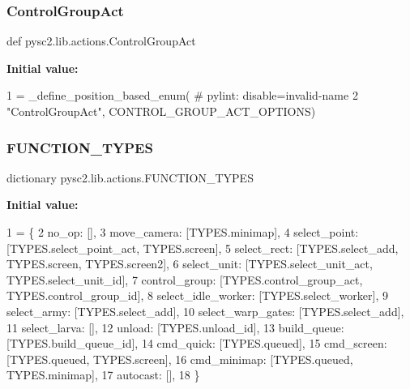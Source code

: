 \subsubsection{\texorpdfstring{Control\+Group\+Act}{ControlGroupAct}}
{\footnotesize\ttfamily def pysc2.\+lib.\+actions.\+Control\+Group\+Act}

{\bfseries Initial value\+:}
\begin{DoxyCode}
1 =  \_define\_position\_based\_enum(  \textcolor{comment}{# pylint: disable=invalid-name}
2     \textcolor{stringliteral}{"ControlGroupAct"}, CONTROL\_GROUP\_ACT\_OPTIONS)
\end{DoxyCode}
\mbox{\label{namespacepysc2_1_1lib_1_1actions_a1e7e50490516cc04dd79662a590e9795}} 
\subsubsection{\texorpdfstring{F\+U\+N\+C\+T\+I\+O\+N\+\_\+\+T\+Y\+P\+ES}{FUNCTION\_TYPES}}
{\footnotesize\ttfamily dictionary pysc2.\+lib.\+actions.\+F\+U\+N\+C\+T\+I\+O\+N\+\_\+\+T\+Y\+P\+ES}

{\bfseries Initial value\+:}
\begin{DoxyCode}
1 =  \{
2     no\_op: [],
3     move\_camera: [TYPES.minimap],
4     select\_point: [TYPES.select\_point\_act, TYPES.screen],
5     select\_rect: [TYPES.select\_add, TYPES.screen, TYPES.screen2],
6     select\_unit: [TYPES.select\_unit\_act, TYPES.select\_unit\_id],
7     control\_group: [TYPES.control\_group\_act, TYPES.control\_group\_id],
8     select\_idle\_worker: [TYPES.select\_worker],
9     select\_army: [TYPES.select\_add],
10     select\_warp\_gates: [TYPES.select\_add],
11     select\_larva: [],
12     unload: [TYPES.unload\_id],
13     build\_queue: [TYPES.build\_queue\_id],
14     cmd\_quick: [TYPES.queued],
15     cmd\_screen: [TYPES.queued, TYPES.screen],
16     cmd\_minimap: [TYPES.queued, TYPES.minimap],
17     autocast: [],
18 \}
\end{DoxyCode}
\mbox{\label{namespacepysc2_1_1lib_1_1actions_abbcb29aed5164d4b08a733a4415b98ce}} 
